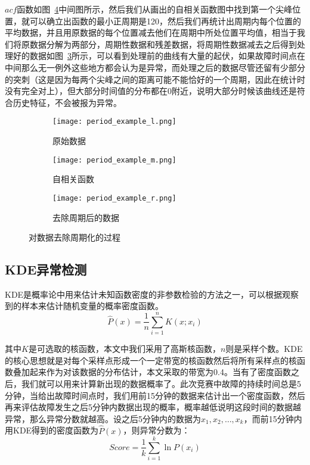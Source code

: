 $acf$函数如图~\ref{fig:period}中间图所示，然后我们从画出的自相关函数图中找到第一个尖峰位置，就可以确立出函数的最小正周期是120，然后我们再统计出周期内每个位置的平均数据，并且用原数据的每个位置减去他们在周期中所处位置平均值，相当于我们将原数据分解为两部分，周期性数据和残差数据，将周期性数据减去之后得到处理好的数据如图~\ref{fig:period:right}所示，可以看到处理前的曲线有大量的起伏，如果故障时间点在中间那么无一例外这些地方都会认为是异常，而处理之后的数据尽管还留有少部分的突刺（这是因为每两个尖峰之间的距离可能不能恰好的一个周期，因此在统计时没有完全对上），但大部分时间值的分布都在0附近，说明大部分时候该曲线还是符合历史特征，不会被报为异常。
\begin{figure}[htbp]
  \begin{subfigure}[b]{0.335\textwidth}
    \begin{minipage}[t]{\linewidth}
    \centering
    \texttt{[image: period\_example\_l.png]}
    \caption{原始数据}
    \label{fig:period:left}
    \end{minipage}
  \end{subfigure}
  \begin{subfigure}[b]{0.325\textwidth}
    \begin{minipage}[t]{\linewidth}
    \centering
    \texttt{[image: period\_example\_m.png]}
    \caption{自相关函数}
    \label{fig:period:middle}
    \end{minipage}
  \end{subfigure}
  \begin{subfigure}[b]{0.325\textwidth}
    \begin{minipage}[t]{\linewidth}
      \centering
      \texttt{[image: period\_example\_r.png]}
      \caption{去除周期后的数据}
      \label{fig:period:right}
      \end{minipage}
    \end{subfigure}
    \caption{对数据去除周期化的过程}
    \label{fig:period}
\end{figure}
\subsection{KDE异常检测}
KDE是概率论中用来估计未知函数密度的非参数检验的方法之一，可以根据观察到的样本来估计随机变量的概率密度函数。
\begin{equation}
\hat{P}(x) = \frac{1}{n}\sum_{i=1}^nK(x;x_i)
\end{equation}

其中$K$是可选取的核函数，本文中我们采用了高斯核函数，$n$则是采样个数。KDE的核心思想就是对每个采样点形成一个一定带宽的核函数然后将所有采样点的核函数叠加起来作为对该数据的分布估计，本文采取的带宽为0.4。当有了密度函数之后，我们就可以用来计算新出现的数据概率了。此次竞赛中故障的持续时间总是5分钟，当给出故障时间点时，我们用前15分钟的数据来估计出一个密度函数，然后再来评估故障发生之后5分钟内数据出现的概率，概率越低说明这段时间的数据越异常，那么异常分数就越高。设之后5分钟内的数据为$x_1,x_2,\dots,x_k$，而前15分钟内用KDE得到的密度函数为$\hat{P}(x)$，则异常分数为：
\begin{equation}
  Score = \frac{1}{k}\sum_{i=1}^k\ln P(x_i)
\end{equation}

